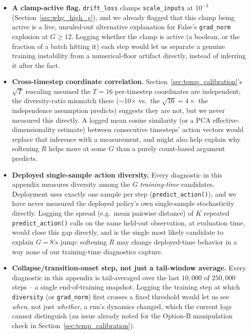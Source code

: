 \documentclass[11pt]{article}
\begin{document}
\begin{itemize}
\item \textbf{A clamp-active flag.} \texttt{drift\_loss} clamps
\texttt{scale\_inputs} at $10^{-3}$ (Section~\ref{sec:why_high_g}), and
we already flagged that this clamp being active is a live, unruled-out
alternative explanation for False's \texttt{grad\_norm} explosion at
$G\ge12$. Logging whether the clamp is active (a boolean, or the
fraction of a batch hitting it) each step would let us separate a
genuine training instability from a numerical-floor artifact directly,
instead of inferring it after the fact.
\item \textbf{Cross-timestep coordinate correlation.} Section~\ref{sec:temp_calibration}'s
$\sqrt{T}$ rescaling assumed the $T=16$ per-timestep coordinates are
independent; the diversity-ratio mismatch there ($\sim$10$\times$ vs.\
the $\sqrt{16}=4\times$ the independence assumption predicts) suggests
they are not, but we never measured this directly. A logged mean cosine
similarity (or a PCA effective-dimensionality estimate) between
consecutive timesteps' action vectors would replace that inference with
a measurement, and might also help explain why softening $R$ helps more
at some $G$ than a purely count-based argument predicts.
\item \textbf{Deployed single-sample action diversity.} Every diagnostic
in this appendix measures diversity among the $G$ \emph{training-time}
candidates. Deployment uses exactly one sample per step
(\texttt{predict\_action()}), and we have never measured the deployed
policy's own single-sample stochasticity directly. Logging the spread
(e.g.\ mean pairwise distance) of $K$ repeated \texttt{predict\_action()}
calls on the same held-out observation, at evaluation time, would close
this gap directly, and is the single most likely candidate to explain
$G=8$'s jump: softening $R$ may change deployed-time behavior in a way
none of our training-time diagnostics capture.
\item \textbf{Collapse/transition-onset step, not just a tail-window
average.} Every diagnostic in this appendix is tail-averaged over the
last $10{,}000$ of $250{,}000$ steps -- a single end-of-training
snapshot. Logging the training step at which \texttt{diversity} (or
\texttt{grad\_norm}) first crosses a fixed threshold would let us see
\emph{when}, not just \emph{whether}, a run's dynamics changed, which
the current logs cannot distinguish (an issue already noted for the
Option-B manipulation check in Section~\ref{sec:temp_calibration}).
\end{itemize}
\end{document}
